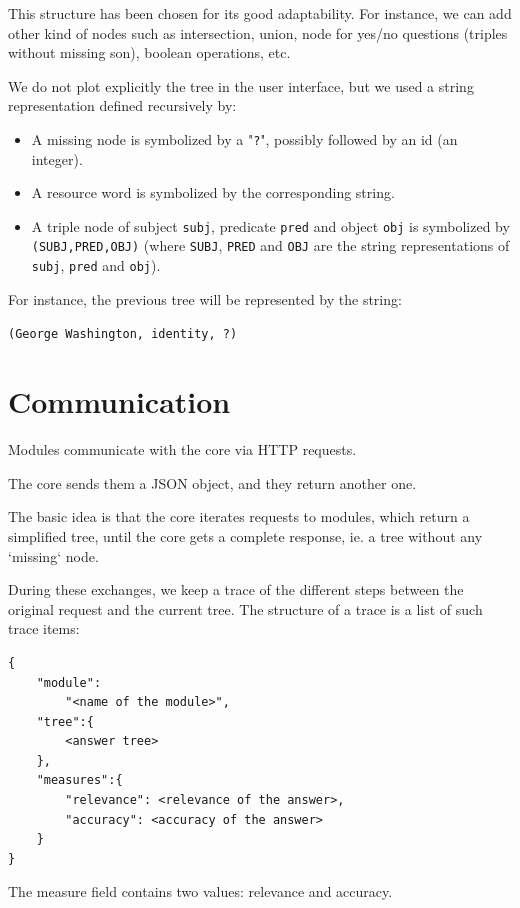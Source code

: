 This structure has been chosen for its good adaptability. For instance, we can add other kind of nodes such as intersection, union, node for yes/no questions (triples without missing son), boolean operations, etc.

We do not plot explicitly the tree in the user interface, but we used a string representation defined recursively by:
\begin{itemize}
 \item A missing node is symbolized by a "\texttt{?}", possibly followed by an id (an integer).
 \item A resource word is symbolized by the corresponding string.
 \item A triple node of subject \texttt{subj}, predicate \texttt{pred} and object \texttt{obj} is symbolized by \texttt{(SUBJ,PRED,OBJ)} (where \texttt{SUBJ},  \texttt{PRED} and \texttt{OBJ} are the string representations of \texttt{subj}, \texttt{pred} and \texttt{obj}).
\end{itemize}

For instance, the previous tree will be represented by the string:

\begin{center}
    \texttt{(George Washington, identity, ?)}
\end{center}

\section{Communication}

Modules communicate with the core via HTTP requests.

The core sends them a JSON object, and they return another one.

The basic idea is that the core iterates requests to modules, which return a simplified tree, until the core gets a complete response, ie. a tree without any `missing` node.

During these exchanges, we keep a trace of the different steps between the original request and the current tree. The structure of a trace is a list of such trace items:
\begin{verbatim}
{
    "module":
        "<name of the module>", 
    "tree":{
        <answer tree>
    },
    "measures":{
        "relevance": <relevance of the answer>,
        "accuracy": <accuracy of the answer>
    }
}
\end{verbatim}

The measure field contains two values: relevance and accuracy.

